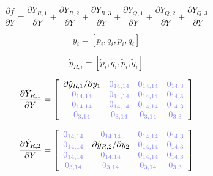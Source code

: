 \documentclass[a4paper,10pt]{article}
\begin{document}
\begin{equation}
\frac{\partial f}{\partial Y}
         =  \frac{\partial\dot{Y}_{R,1}}{\partial Y} + \frac{\partial\dot{Y}_{R,2}}{\partial Y} + \frac{\partial\dot{Y}_{R,3}}{\partial Y}
              + \frac{\partial\dot{Y}_{Q,1}}{\partial Y} + \frac{\partial\dot{Y}_{Q,2}}{\partial Y} + \frac{\partial\dot{Y}_{Q,3}}{\partial Y}
\end{equation}


\begin{equation}
y_{i} = [p_i, q_i, \dot{p}_i, \dot{q}_i]
\end{equation}

\begin{equation}
\dot{y}_{R,i} = [\dot{p}_i, \dot{q}_i, \ddot{\tilde{p}}_i, \ddot{\tilde{q}}_i]
\end{equation}

\newcommand{\zm}[1]{\ensuremath{ {\color{opaqueblue} 0_{#1} } }}

\begin{equation}
\frac{\partial\dot{Y}_{R,1}}{\partial Y}=
\left[ \begin{array}{cccc}
\partial \dot{y}_{R,1} / \partial y_1 & \zm{14,14} & \zm{14,14} & \zm{14,3}\\
\zm{14,14}                            & \zm{14,14} & \zm{14,14} & \zm{14,3}\\
\zm{14,14}                            & \zm{14,14} & \zm{14,14} & \zm{14,3}\\
\zm{3,14}                             & \zm{3,14}  & \zm{3,14}  & \zm{3,3}\\
\end{array} \right]
\end{equation}

\begin{equation}
\frac{\partial\dot{Y}_{R,2}}{\partial Y}=
\left[ \begin{array}{cccc}
\zm{14,14} & \zm{14,14}                            & \zm{14,14} & \zm{14,3}\\
\zm{14,14} & \partial \dot{y}_{R,2} / \partial y_2 & \zm{14,14} & \zm{14,3}\\
\zm{14,14} & \zm{14,14}                            & \zm{14,14} & \zm{14,3}\\
\zm{3,14}  & \zm{3,14}                             & \zm{3,14}  & \zm{3,3}\\
\end{array}  \right]
\end{equation}
\end{document}
